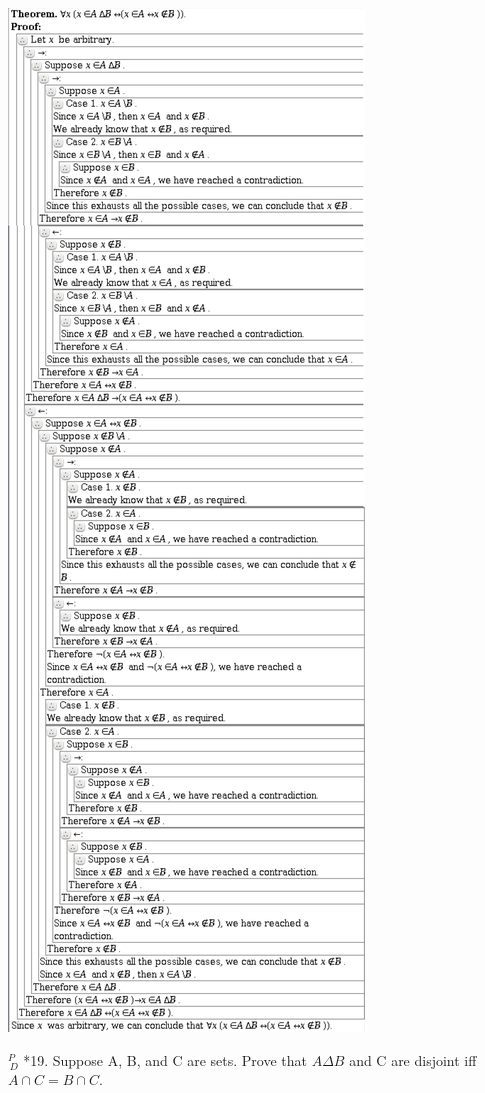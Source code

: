 \documentclass{article}
\begin{document}
\includegraphics[scale=0.12]{3_5_18}

\vspace{30pt}

$^{\textit{P}}_{\, \textit{D}}$ *19. Suppose A, B, and C are sets. Prove that $A \Delta B$ and C are disjoint iff
$A \cap C = B \cap C$.
\end{document}
